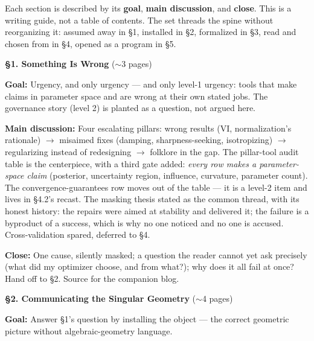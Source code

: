 \documentclass[11pt]{article}
\begin{document}
Each section is described by its \textbf{goal}, \textbf{main
discussion}, and \textbf{close}. This is a writing guide, not a table of
contents. The set threads the spine without reorganizing it: assumed
away in \S1, installed in \S2, formalized in \S3, read and chosen from
in \S4, opened as a program in \S5.

\bigskip

\noindent\textbf{\S1. Something Is Wrong} ($\sim$3 pages)

\textbf{Goal:} Urgency, and only urgency --- and only level-1 urgency:
tools that make claims in parameter space and are wrong at their own
stated jobs. The governance story (level 2) is planted as a question,
not argued here.

\textbf{Main discussion:} Four escalating pillars: wrong results (VI,
normalization's rationale) $\to$ misaimed fixes (damping,
sharpness-seeking, isotropizing) $\to$ regularizing instead of
redesigning $\to$ folklore in the gap. The pillar-tool audit table is
the centerpiece, with a third gate added: \emph{every row makes a
parameter-space claim} (posterior, uncertainty region, influence,
curvature, parameter count). The convergence-guarantees row moves out of
the table --- it is a level-2 item and lives in \S4.2's recast. The
masking thesis stated as the common thread, with its honest history: the
repairs were aimed at stability and delivered it; the failure is a
byproduct of a success, which is why no one noticed and no one is
accused. Cross-validation spared, deferred to \S4.

\textbf{Close:} One cause, silently masked; a question the reader cannot
yet ask precisely (what did my optimizer choose, and from what?); why
does it all fail at once? Hand off to \S2. Source for the companion
blog.

\bigskip

\noindent\textbf{\S2. Communicating the Singular Geometry} ($\sim$4
pages)

\textbf{Goal:} Answer \S1's question by installing the object --- the
correct geometric picture without algebraic-geometry language.
\end{document}
